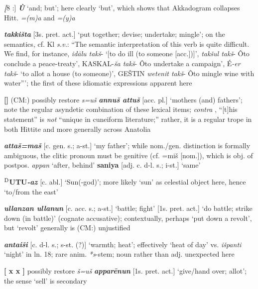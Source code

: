 \documentclass[10pt]{article}
\newcommand{\supersc}[1]{$^{\textrm{\scriptsize{#1}}}$}  	%
\newcommand{\bit}[1]{\textbf{\textit{#1}}}				%
\newcommand{\p}[1]{{\tiny[{#1}]}}					%
\newcommand{\hith}{\textsubwedge{h}}
\renewcommand{\.}[1]{\textsubdot{#1}}
\begin{document}
\begin{description}
\bit[8 :] \bit{\`U} `and; but'; here clearly `but', which shows that Akkadogram collapses Hitt. \textit{=(m)a} and \textit{=(y)a}

\item[8 :] \bit{takki\v{s}ta} \p{3s. pret. act.} `put together; devise; undertake; mingle'; on the semantics, cf. Kl \textit{s.v.}: ``The semantic interpretation of this verb is quite difficult. We find, for instance, \textit{id\=alu tak\v{s}}- `[to do ill (to someone \p{acc.})]', \textit{tak\v{s}ul tak\v{s}}- Ôto conclude a peace-treaty', KASKAL-\textit{\v{s}a tak\v{s}}- Ôto undertake a campaign', \'E\textit{-er tak\v{s}}- `to allot a house (to someone)', GE\v{S}TIN \textit{wetenit tak\v{s}}- Ôto mingle wine with water''';  the first of these idiomatic expressions apparent here

\item[9 :] \textbf{[\hspace{.5cm}]} (CM:) possibly restore \textit{s=u\v{s}} \bit{annu\v{s} attu\v{s}} \p{acc. pl.} `mothers (and) fathers'; note the regular asyndetic combination of these lexical items; \textit{contra} \citet[36]{bryce2005kingdom}, ``[t]his statement'' is \emph{not} ``unique in cuneiform literature;'' rather, it is a regular trope in both Hittite and more generally across Anatolia

\item[10 :] \bit{atta\v{s}=ma\v{s}} \p{c. gen. s.; a-st.} `my father'; while nom./gen. distinction is formally ambiguous, the clitic pronoun must be genitive (cf. =mi\v{s} \p{nom.}), which is obj. of postpos. \textit{appan} `after, behind' \textbf{saniya} \p{adj. c. d-l. s.; i-st.} `same'

\item[11 :] \textbf{\supersc{D}UTU}\bit{-az} \p{c. abl.} `Sun(-god)'; more likely `sun' as celestial object here, hence `to/from the east'

\item[12 :] \bit{{\hith}ullanzan {\hith}ullanun} \p{c. acc. s.; a-st.} `battle; fight' \p{1s. pret. act.} `do battle; strike down (in battle)' (cognate accusative); contextually, perhaps `put down a revolt', but `revolt' generally is (CM:) unjustified

\item[17 :] \bit{{\hith}antai\v{s}i} \p{c. d-l. s.; s-st. (?)} `warmth; heat'; effectively `heat of day' vs. \textit{i\v{s}panti} `night' in ln. 18; rare anim. \textit{*s}-stem; noun rather than adj. unexpected here

\item[20 :] \textbf{[ x x ]} possibly restore \textit{\v{s}=u\v{s}} \bit{{\hith}appar\=enun} \p{1s. pret. act.} `give/hand over; allot'; the sense `sell' is secondary


\end{description}
\end{document}
